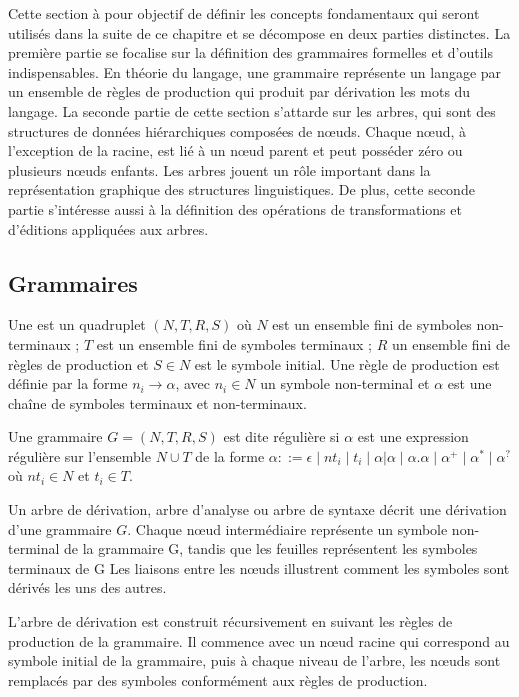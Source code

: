 Cette section à pour objectif de définir les concepts fondamentaux qui seront utilisés dans la suite de ce chapitre et se décompose en deux parties distinctes.
La première partie se focalise sur la définition des grammaires formelles et d'outils indispensables.
En théorie du langage, une grammaire représente un langage par un ensemble de règles de production qui produit par dérivation les mots du langage.
La seconde partie de cette section s'attarde sur les arbres, qui sont des structures de données hiérarchiques composées de nœuds.
Chaque nœud, à l'exception de la racine, est lié à un nœud parent et peut posséder zéro ou plusieurs nœuds enfants.
Les arbres jouent un rôle important dans la représentation graphique des structures linguistiques.
De plus, cette seconde partie s'intéresse aussi à la définition des opérations de transformations et d'éditions appliquées aux arbres.

\subsection{Grammaires}

\begin{definition}
    Une  est un quadruplet $(N, T, R, S)$ où $N$ est un ensemble fini de symboles non-terminaux ; $T$ est un ensemble fini de symboles terminaux ; $R$ un ensemble fini de règles de production et $S \in N$ est le symbole initial.
    Une règle de production est définie par la forme $n_i \to \alpha$, avec $n_i \in N$ un symbole non-terminal et $\alpha$ est une chaîne de symboles terminaux et non-terminaux.
\end{definition}

\begin{definition}
    Une grammaire $G = (N, T, R, S)$ est dite régulière si $\alpha$ est une expression régulière sur l'ensemble $N \cup T$ de la forme $\alpha ::= \epsilon \mid nt_i \mid t_i \mid \alpha|\alpha \mid \alpha.\alpha \mid \alpha^+ \mid \alpha^* \mid \alpha^?$ où $nt_i \in N$ et $t_i \in T$.
\end{definition}

\begin{definition}
    Un arbre de dérivation, arbre d'analyse ou arbre de syntaxe décrit une dérivation d'une grammaire $G$.
    Chaque nœud intermédiaire représente un symbole non-terminal de la grammaire G, tandis que les feuilles représentent les symboles terminaux de G
    Les liaisons entre les nœuds illustrent comment les symboles sont dérivés les uns des autres.

    L'arbre de dérivation est construit récursivement en suivant les règles de production de la grammaire.
    Il commence avec un nœud racine qui correspond au symbole initial de la grammaire, puis à chaque niveau de l'arbre, les nœuds sont remplacés par des symboles conformément aux règles de production.
\end{definition}

